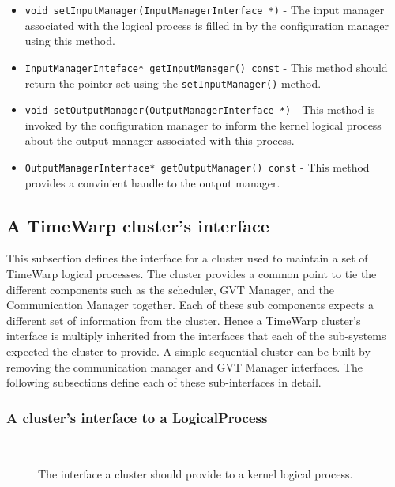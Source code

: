 \begin{itemize}
\item {\tt void setInputManager(InputManagerInterface *)} - The input
  manager associated with the logical process is filled in by the
  configuration manager using this method.

\item {\tt InputManagerInteface* getInputManager() const} - This method
  should return the pointer set using the {\tt setInputManager()} method.
  
\item {\tt void setOutputManager(OutputManagerInterface *)} - This method
  is invoked by the configuration manager to inform the kernel logical
  process about the output manager associated with this process.

\item {\tt OutputManagerInterface* getOutputManager() const} - This
  method provides a convinient handle to the output manager.

\end{itemize}

\subsection{A TimeWarp cluster's interface}

This subsection defines the interface for a cluster used to maintain a set
of TimeWarp logical processes. The cluster provides a common point to tie
the different components such as the scheduler, GVT Manager, and the
Communication Manager together. Each of these sub components expects a
different set of information from the cluster. Hence a TimeWarp cluster's
interface is multiply inherited from the interfaces that each of the
sub-systems expected the cluster to provide. A simple sequential cluster
can be built by removing the communication manager and GVT Manager
interfaces. The following subsections define each of these sub-interfaces
in detail.

\subsubsection{A cluster's interface to a LogicalProcess}

\begin{figure*}
\begin{center}
\ 
\end{center}
\caption{The interface a cluster should provide to a kernel logical
  process.}\label{fig:ClusterKernelLogicalProcessInterface}  
\end{figure*}


